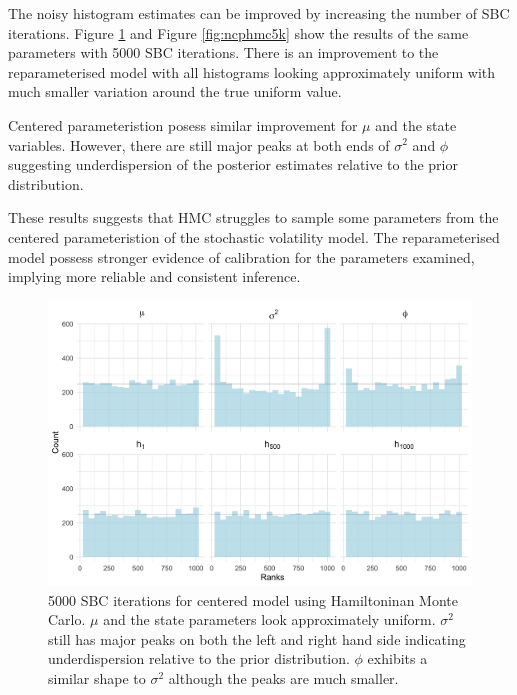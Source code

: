 \documentclass[12pt, a4paper]{article}
\begin{document}
    The noisy histogram estimates can be improved by increasing the number of SBC iterations. Figure \ref{fig:cphmc5k} and Figure \ref{fig:ncphmc5k} show the results of the same parameters with 5000 SBC iterations. There is an improvement to the reparameterised model with all histograms looking approximately uniform with much smaller variation around the true uniform value. 
    
    Centered parameteristion posess similar improvement for $\mu$ and the state variables. However, there are still major peaks at both ends of $\sigma^2$ and $\phi$ suggesting underdispersion of the posterior estimates relative to the prior distribution.

    These results suggests that HMC struggles to sample some parameters from the centered parameteristion of the stochastic volatility model. The reparameterised model possess stronger evidence of calibration for the parameters examined, implying more reliable and consistent inference.

    \begin{figure}[H]
        \centering
        \includegraphics[scale=0.09]{results/hmc_cp_5k.png}
        \caption{5000 SBC iterations for centered model using Hamiltoninan Monte Carlo. $\mu$ and the state parameters look approximately uniform. $\sigma^2$ still has major peaks on both the left and right hand side indicating underdispersion relative to the prior distribution. $\phi$ exhibits a similar shape to $\sigma^2$ although the peaks are much smaller.}
        \label{fig:cphmc5k}
    \end{figure}
\end{document}
